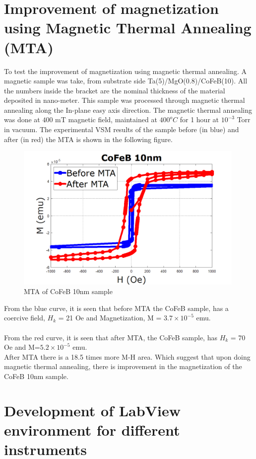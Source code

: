 \documentclass[12pt,a4paper,bold]{thesis}
\theoremstyle{thm}
\theoremstyle{definition}
\begin{document}
\section{Improvement of magnetization using Magnetic Thermal Annealing (MTA)}
To test the improvement of magnetization using magnetic thermal annealing. A magnetic sample was take, from substrate side Ta(5)/MgO(0.8)/CoFeB(10). All the numbers inside the bracket are the nominal thickness of the material deposited in nano-meter. This sample was processed through magnetic thermal annealing along the In-plane easy axis direction. The magnetic thermal annealing was done at $400$ mT magnetic field, maintained at $400^oC$ for 1 hour at $10^{-3}$ Torr in vacuum. The experimental VSM results of the sample before (in blue) and after (in red) the MTA is shown in the following figure.
\begin{figure}[H]
	\centering
   \includegraphics[height=7.1cm]{Images/37.png} 
   \caption{MTA of CoFeB 10nm sample}
\end{figure}
From the blue curve, it is seen that before MTA the CoFeB sample, has a coercive field, $H_k$ = 21 Oe and Magnetization, M = $3.7\times10^{-5}$ emu.\\
\\
From the red curve, it is seen that after MTA, the CoFeB sample, has $H_k$ = 70 Oe and M=$5.2 \times 10^{-5}$ emu.\\
After MTA there is a 18.5 times more M-H area. Which suggest that upon doing magnetic thermal annealing, there is improvement in the magnetization of the CoFeB 10nm sample.

\section{Development of LabView environment for different instruments}
\end{document}
